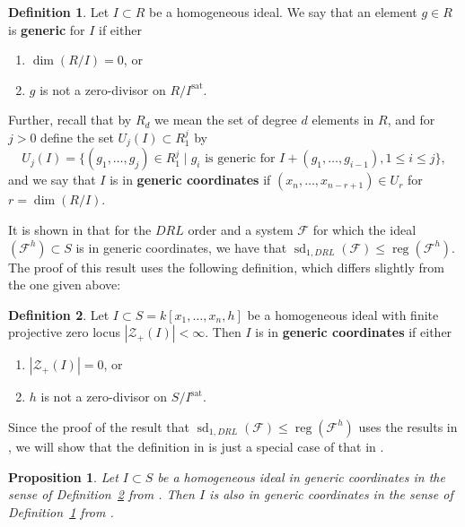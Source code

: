 \documentclass[11pt]{article}
\newcommand{\F}{\mathcal{F}}
\newcommand{\sat}{^{\text{sat}}}
\DeclareMathOperator{\sd}{sd}
\DeclareMathOperator{\reg}{reg}
\newtheorem{proposition}{Proposition}
\theoremstyle{definition}
\newtheorem{definition}{Definition}
\begin{document}
\begin{definition}\label{def:genA}
	Let $I \subset R$ be a homogeneous ideal. We say that an element $g \in R$ is \textbf{generic} for $I$ if either \begin{enumerate}[noitemsep, label = (\arabic*)]
		\item $\dim(R/I) = 0$, or
		\item $g$ is not a zero-divisor on $R/I\sat$. 
	\end{enumerate} Further, recall that by $R_d$ we mean the set of degree $d$ elements in $R$, and for $j > 0$ define the set $U_j(I) \subset R_1^j$ by \[ U_j(I) = \{(g_1, \dots, g_j) \in R_1^j \mid g_i \text{ is generic for } I + (g_1, \dots, g_{i - 1}), 1 \leq i \leq j\}, \] and we say that $I$ is in \textbf{generic coordinates} if $(x_n, \dots, x_{n - r + 1}) \in U_r$ for $r = \dim(R/I)$. 
\end{definition}


It is shown in \cite{caminata2020solving} that for the $DRL$ order and a system $\F$ for which the ideal $(\F^h) \subset S$ is in generic coordinates, we have that $\sd_{1,DRL}(\F) \leq \reg(\F^h)$. The proof of this result uses the following definition, which differs slightly from the one given above:


\begin{definition}\label{def:genB}
	Let $I \subset S = k[x_1, \dots, x_n, h]$ be a homogeneous ideal with finite projective zero locus $|\mathcal{Z}_+(I)| < \infty$. Then $I$ is in \textbf{generic coordinates} if either \begin{enumerate}[noitemsep, label = (\roman*)]
		\item $|\mathcal{Z}_+(I)| = 0$, or
		\item $h$ is not a zero-divisor on $S/I\sat$. 
	\end{enumerate}
\end{definition}


Since the proof of the result that $\sd_{1, DRL}(\F) \leq \reg(\F^h)$ uses the results in \cite{bayer1987criterion}, we will show that the definition in \cite{caminata2020solving} is just a special case of that in \cite{bayer1987criterion}. 


\begin{proposition}
	Let $I \subset S$ be a homogeneous ideal in generic coordinates in the sense of Definition~\ref{def:genB} from \cite{caminata2020solving}. Then $I$ is also in generic coordinates in the sense of Definition~\ref{def:genA} from \cite{bayer1987criterion}. 
\end{proposition}
\end{document}
